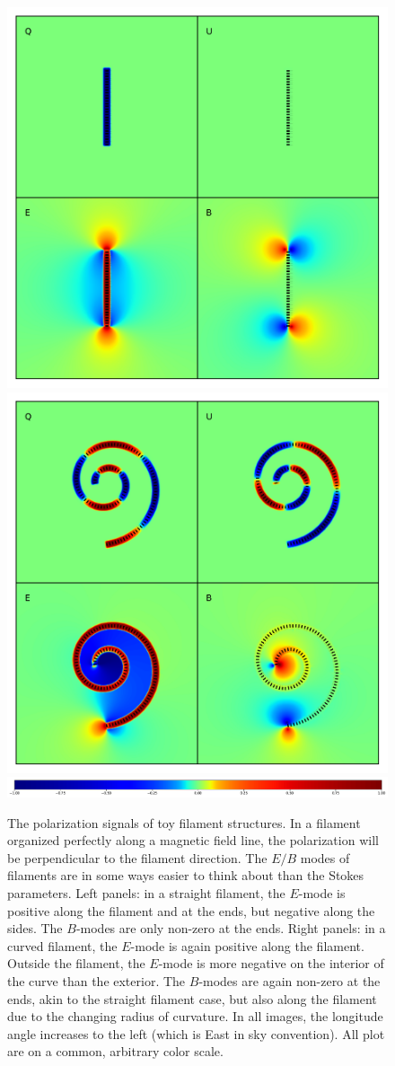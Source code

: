 \documentclass[a4paper,11pt]{article}
\begin{document}
\begin{figure}[t]
\includegraphics[width=0.5\columnwidth]{line.pdf}
\includegraphics[width=0.5\columnwidth]{spiral.pdf}
\includegraphics[width=1.0\columnwidth]{colorbar.pdf}
\caption{ The polarization signals of toy filament structures. In a filament organized perfectly along a magnetic field line, the polarization will be perpendicular to the filament direction.  The $E/B$ modes of filaments are in some ways easier to think about than the Stokes parameters. Left panels: in a straight filament, the $E$-mode is positive along the filament and at the ends, but negative along the sides.  The $B$-modes are only non-zero at the ends.  Right panels: in a curved filament, the $E$-mode is again positive along the filament.  Outside the filament, the $E$-mode is more negative on the interior of the curve than the exterior.  The $B$-modes are again non-zero at the ends, akin to the straight filament case, but also along the filament due to the changing radius of curvature. In all images, the longitude angle increases to the left (which is East in sky convention).  All plot are on a common, arbitrary color scale.}
\label{fig:polfilaments}
\end{figure}
\end{document}
